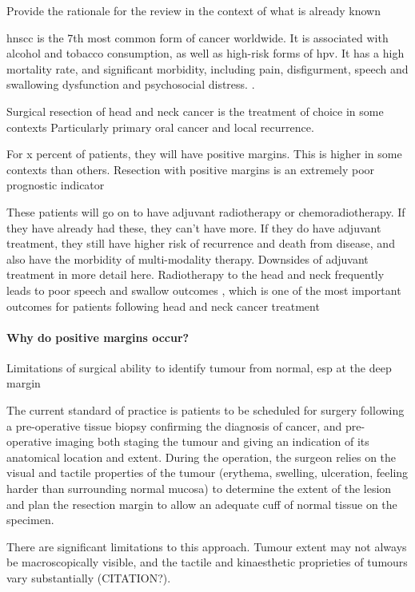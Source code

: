 
Provide the rationale for the review in the context of what is already known

\Gls{hnscc} is the 7th most common form of cancer worldwide. 
It is associated with alcohol and tobacco consumption, as well as high-risk forms of \gls{hpv}.
It has a high mortality rate, and significant morbidity, including pain, disfigurment, speech and swallowing dysfunction and psychosocial distress. \cite{chowHeadNeckCancer2020}.



Surgical resection of head and neck cancer is the treatment of choice in some contexts
Particularly primary oral cancer and local recurrence.

For x percent of patients, they will have positive margins. 
This is higher in some contexts than others.
Resection with positive margins is an extremely poor prognostic indicator

These patients will go on to have adjuvant radiotherapy or chemoradiotherapy.
If they have already had these, they can't have more.
If they do have adjuvant treatment, they still have higher risk of recurrence and death from disease, and also have the morbidity of multi-modality therapy.
Downsides of adjuvant treatment in more detail here.
Radiotherapy to the head and neck frequently leads to poor speech and swallow outcomes \cite{machtayFactorsAssociatedSevere2008, wangPharyngoesophagealStrictureTreatment2012}, which is one of the most important outcomes for patients following head and neck cancer treatment \cite{wilsonDysphagiaNonsurgicalHead2011} 

\paragraph{Why do positive margins occur?}
Limitations of surgical ability to identify tumour from normal, esp at the deep margin

The current standard of practice is patients to be scheduled for surgery following a pre-operative tissue biopsy confirming the diagnosis of cancer, and pre-operative imaging both staging the tumour and giving an indication of its anatomical location and extent.
During the operation, the surgeon relies on the visual and tactile properties of the tumour (erythema, swelling, ulceration, feeling harder than surrounding normal mucosa) to determine the extent of the lesion and plan the resection margin to allow an adequate cuff of normal tissue on the specimen.

There are significant limitations to this approach. 
Tumour extent may not always be macroscopically visible, and the tactile and kinaesthetic proprieties of tumours vary substantially (CITATION?).

